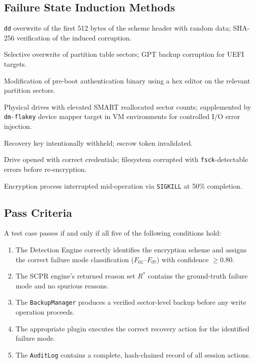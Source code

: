 \documentclass[11pt,a4paper]{report}
\begin{document}
\subsection{Failure State Induction Methods}

\begin{description}[leftmargin=2em]
  \item[$F_{01}$] \texttt{dd} overwrite of the first 512 bytes of the scheme header with
    random data; SHA-256 verification of the induced corruption.
  \item[$F_{02}$] Selective overwrite of partition table sectors; GPT backup corruption
    for UEFI targets.
  \item[$F_{03}$] Modification of pre-boot authentication binary using a hex editor on the
    relevant partition sectors.
  \item[$F_{04}$] Physical drives with elevated SMART reallocated sector counts;
    supplemented by \texttt{dm-flakey} device mapper target in VM environments for
    controlled I/O error injection.
  \item[$F_{05}$] Recovery key intentionally withheld; escrow token invalidated.
  \item[$F_{06}$] Drive opened with correct credentials; filesystem corrupted with
    \texttt{fsck}-detectable errors before re-encryption.
  \item[$F_{07}$] Encryption process interrupted mid-operation via \texttt{SIGKILL} at
    50\% completion.
\end{description}

\subsection{Pass Criteria}

A test case passes if and only if all five of the following conditions hold:

\begin{enumerate}[label=\textbf{P\arabic*.}]
  \item The Detection Engine correctly identifies the encryption scheme and assigns the
    correct failure mode classification ($F_{01}$--$F_{07}$) with confidence $\geq 0.80$.
  \item The SCPR engine's returned reason set $R^*$ contains the ground-truth failure mode
    and no spurious reasons.
  \item The \texttt{BackupManager} produces a verified sector-level backup before any write
    operation proceeds.
  \item The appropriate plugin executes the correct recovery action for the identified
    failure mode.
  \item The \texttt{AuditLog} contains a complete, hash-chained record of all session
    actions.
\end{enumerate}
\end{document}
